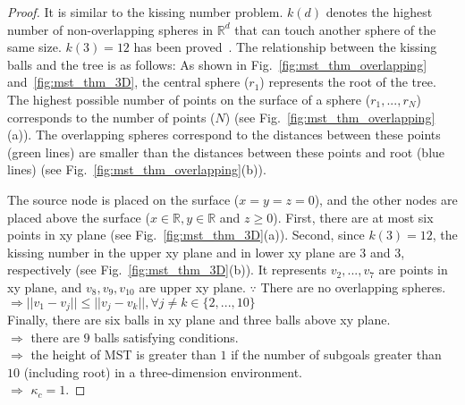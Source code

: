 \begin{proof}
It is similar to the kissing number problem.
$k(d)$ denotes the highest number of non-overlapping spheres in $\mathbb{R}^d$ that can touch another sphere of the same size. $k(3)=12$ has been proved~\cite{schutte1952problem}.
The relationship between the kissing balls and the tree is as follows:
As shown in Fig.~\ref{fig:mst_thm_overlapping} and~\ref{fig:mst_thm_3D},
the central sphere ($r_1$) represents the root of the tree.
The highest possible number of points on the surface of a sphere ($r_1,...,r_N$) corresponds to the number of points ($N$) (see Fig.~\ref{fig:mst_thm_overlapping}(a)).
The overlapping spheres correspond to the distances between these points (green lines) are smaller than the distances between these points and root (blue lines) (see Fig.~\ref{fig:mst_thm_overlapping}(b)).


The source node is placed on the surface ($x=y=z=0$), and the other nodes are placed above the surface ($x \in \mathbb{R}, y\in \mathbb{R}$ and $z \ge 0$).
First, there are at most six points in xy plane (see Fig.~\ref{fig:mst_thm_3D}(a)).
Second, since $k(3)=12$, the kissing number in the upper xy plane and in lower xy plane are $3$ and $3$, respectively (see Fig.~\ref{fig:mst_thm_3D}(b)). It represents $v_2,...,v_7$ are points in xy plane, and $v_8, v_9, v_{10}$ are upper xy plane. $\because$ There are no overlapping spheres. \\
$\Rightarrow ||v_1-v_j||\le||v_j-v_k||, \forall j \ne k \in\{2,...,10\}$ \\
Finally, there are six balls in xy plane and three balls above xy plane.\\
$\Rightarrow$ there are $9$ balls satisfying conditions. \\
$\Rightarrow$ the height of MST is greater than $1$ if the number of subgoals greater than $10$ (including root) in a three-dimension environment. \\
$\Rightarrow$ $\kappa_c = 1.$





\end{proof}

